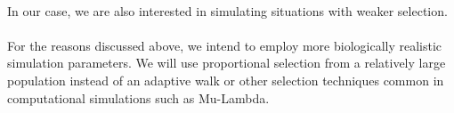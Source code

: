 \documentclass[12pt,letterpaper,titlepage]{article}
\begin{document}
\paragraph{}
In our case, we are also interested in simulating situations with weaker
selection.

\paragraph{}
For the reasons discussed above, we intend to employ more biologically
realistic simulation parameters. We will use proportional selection from a
relatively large population instead of an adaptive walk or other selection
techniques common in computational simulations such as Mu-Lambda.


{}
\end{document}
